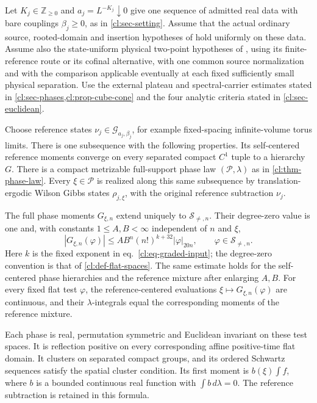 \documentclass[11pt,letterpaper,reqno]{amsart}
\makeatletter
\numberwithin{equation}{section}
\renewcommand{\eqref}[1]{\textup{eq.~\ref{#1}}}
\theoremstyle{definition}
\newcommand{\ms@majorstart}{%
  \pushQED{\qed}\renewcommand{\qedsymbol}{$\blacksquare\square$}}
\newenvironment{theorem}[1][]{\ms@majorstart\ms@theorem[#1]}
  {\popQED\endms@theorem}
\theoremstyle{remark}
\makeatother
\begin{document}
\begin{theorem}[A realized nontrivial scalar phase]
\label{cl:thm-scalar-continuum}
Let \(K_j\in\mathbb Z_{\ge0}\) and \(a_j=L^{-K_j}\downarrow0\)
give one sequence of admitted
real data with bare couplings \(\beta_j\ge0\), as in
\cref{cl:sec-setting}. Assume that the actual ordinary
source, rooted-domain and insertion hypotheses of
\cite[Theorems~B and C]{SI} hold uniformly on these data.
Assume also the state-uniform physical two-point hypotheses
of \cite[Theorem~A]{FP}, using its finite-reference route
or its cofinal alternative, with one common source
normalization and with the comparison applicable eventually
at each fixed sufficiently small physical separation.
Use the external plateau and spectral-carrier estimates
stated in \cref{cl:sec-phases,cl:prop-cube-cone} and the four
analytic criteria stated in \cref{cl:sec-euclidean}.

Choose reference states
\(\nu_j\in\mathcal G_{a_j,\beta_j}\), for example
fixed-spacing infinite-volume torus limits.
There is one subsequence with the following properties.
Its self-centered reference moments converge on every
separated compact \(C^1\) tuple to a hierarchy \(G\).
There is a compact metrizable full-support phase law
\((\mathcal P,\lambda)\) as in
\cref{cl:thm-phase-law}. Every \(\xi\in\mathcal P\)
is realized along this same subsequence by translation-ergodic
Wilson Gibbs states \(\rho_{j,\xi}\), with the original
reference subtraction \(\nu_j\).

The full phase moments \(G_{\xi,n}\) extend uniquely to
\(\mathcal S_{\ne,n}\). Their degree-zero value is one and,
with constants \(1\le A,B<\infty\) independent of \(n\) and \(\xi\),
\begin{equation}\label{cl:eq-main-growth}
 |G_{\xi,n}(\varphi)|
 \le A B^n(n!)^{k+32}|\varphi|_{20n},
 \qquad \varphi\in\mathcal S_{\ne,n}.
\end{equation}
Here \(k\) is the fixed exponent in
\eqref{cl:eq-graded-input}; the degree-zero convention is
that of \cref{cl:def-flat-spaces}.
The same estimate holds for the self-centered phase
hierarchies and the reference mixture after enlarging
\(A,B\). For every fixed flat test \(\varphi\), the
reference-centered evaluations \(\xi\mapsto G_{\xi,n}(\varphi)\)
are continuous, and their \(\lambda\)-integrals equal the
corresponding moments of the reference mixture.

Each phase is real, permutation symmetric and Euclidean
invariant on these test spaces. It is reflection positive
on every corresponding affine positive-time flat domain.
It clusters on separated compact groups, and its ordered
Schwartz sequences satisfy the spatial cluster condition.
Its first moment is \(b(\xi)\int f\), where \(b\) is a
bounded continuous real function with
\(\int b\,d\lambda=0\). The reference subtraction is
retained in this formula.


\end{theorem}
\end{document}
